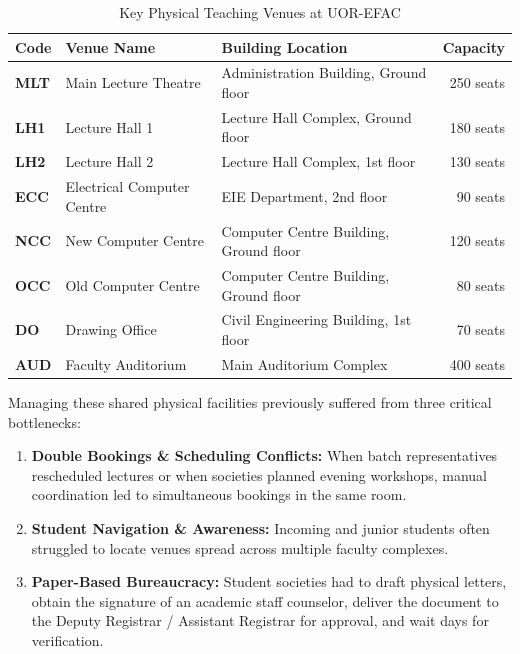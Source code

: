 \documentclass[11pt,a4paper]{article}
\begin{document}
\begin{table}[H]
    \centering
    \caption{Key Physical Teaching Venues at UOR-EFAC}
    \begin{tabular}{lllr}
        \toprule
        \textbf{Code} & \textbf{Venue Name} & \textbf{Building Location} & \textbf{Capacity} \\
        \midrule
        \textbf{MLT} & Main Lecture Theatre & Administration Building, Ground floor & 250 seats \\
        \textbf{LH1} & Lecture Hall 1 & Lecture Hall Complex, Ground floor & 180 seats \\
        \textbf{LH2} & Lecture Hall 2 & Lecture Hall Complex, 1st floor & 130 seats \\
        \textbf{ECC} & Electrical Computer Centre & EIE Department, 2nd floor & 90 seats \\
        \textbf{NCC} & New Computer Centre & Computer Centre Building, Ground floor & 120 seats \\
        \textbf{OCC} & Old Computer Centre & Computer Centre Building, Ground floor & 80 seats \\
        \textbf{DO}  & Drawing Office & Civil Engineering Building, 1st floor & 70 seats \\
        \textbf{AUD} & Faculty Auditorium & Main Auditorium Complex & 400 seats \\
        \bottomrule
    \end{tabular}
\end{table}

Managing these shared physical facilities previously suffered from three critical bottlenecks:
\begin{enumerate}
    \item \textbf{Double Bookings \& Scheduling Conflicts:} When batch representatives rescheduled lectures or when societies planned evening workshops, manual coordination led to simultaneous bookings in the same room.
    \item \textbf{Student Navigation \& Awareness:} Incoming and junior students often struggled to locate venues spread across multiple faculty complexes.
    \item \textbf{Paper-Based Bureaucracy:} Student societies had to draft physical letters, obtain the signature of an academic staff counselor, deliver the document to the Deputy Registrar / Assistant Registrar for approval, and wait days for verification.
\end{enumerate}

\end{document}
